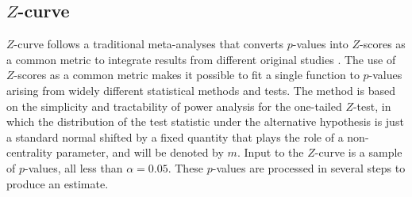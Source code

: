 \documentclass[jou]{apa6} %
\begin{document}

\subsection{$Z$-curve}\label{ZCURVE}      

$Z$-curve follows a traditional meta-analyses that converts $p$-values into $Z$-scores as a common metric to integrate results from different original studies \parencite{StoufferEtAl1949, Rosenthal1979}. The use of $Z$-scores as a common metric makes it possible to fit a single function to $p$-values arising from widely different statistical methods and tests. The method is based on the simplicity and tractability of power analysis for the one-tailed $Z$-test, in which the distribution of the test statistic under the alternative hypothesis is just a standard normal shifted by a fixed quantity that plays the role of a non-centrality parameter, and will be denoted by $m$. Input to the $Z$-curve is a sample of $p$-values, all less than $\alpha=0.05$. These $p$-values are processed in several steps to produce an estimate.
\end{document}
